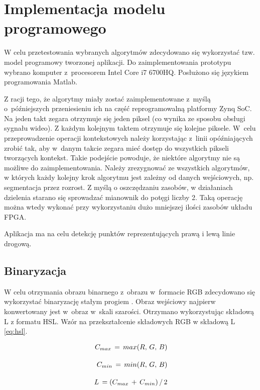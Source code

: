 \chapter{Implementacja modelu programowego}

W celu przetestowania wybranych algorytmów zdecydowano się wykorzystać tzw. model programowy tworzonej aplikacji. 
Do zaimplementowania prototypu wybrano komputer z~procesorem Intel Core i7 6700HQ. 
Posłużono się językiem programowania Matlab.

Z racji tego, że algorytmy miały zostać zaimplementowane z~myślą o~późniejszych przeniesieniu ich na część reprogramowalną platformy Zynq SoC.
Na jeden takt zegara otrzymuje się jeden piksel (co wynika ze sposobu obsługi sygnału wideo).
Z każdym kolejnym taktem otrzymuje się kolejne piksele. W~celu przeprowadzenie operacji kontekstowych należy korzystając z~linii opóźniających zrobić tak, aby w~danym takcie zegara mieć dostęp do wszystkich pikseli tworzących kontekst. Takie podejście powoduje, że niektóre algorytmy nie są możliwe do zaimplementowania. Należy zrezygnować ze wszystkich algorytmów, w których każdy kolejny krok algorytmu jest zależny od danych wejściowych, np. segmentacja przez rozrost. 
Z myślą o oszczędzaniu zasobów, w działaniach dzielenia starano się sprowadzać mianownik do potęgi liczby 2.
Taką operację można wtedy wykonać przy wykorzystaniu dużo mniejszej ilości zasobów układu FPGA.  

Aplikacja ma na celu detekcję punktów reprezentujących prawą i lewą linie drogową. 

\section{Binaryzacja}
W celu otrzymania obrazu binarnego z~obrazu w~formacie RGB zdecydowano się wykorzystać binaryzację stałym progiem \cite{1}. 
Obraz wejściowy najpierw konwertowany jest w~obraz w~skali szarości. Otrzymano wykorzystując składową L z formatu HSL. Wzór na przekształcenie składowych RGB w składową L \eqref{eq:hsl}. 

\begin{equation}
{\displaystyle {\begin{aligned}\,C_{max}\,=\,max(R,\,G,\,B)\\[10pt]\,C_{min}\,=\,min(R,\,G,\,B)\\[10pt]\,L\,=(C_{max}\,+\,C_{min})\,/\,2\end{aligned}}}\\[10pt]
\label{eq:hsl}
\end{equation}


